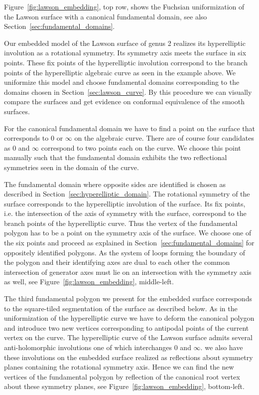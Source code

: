 \documentclass[Thesis.tex]{subfiles}
\begin{document}
Figure~\ref{fig:lawson_embedding}, top row, shows the Fuchsian uniformization of the Lawson surface with a canonical fundamental domain, see also Section~\ref{sec:fundamental_domains}.

Our embedded model of the Lawson surface of genus 2 realizes its hyperelliptic involution as a rotational symmetry.
Its symmetry axis meets the surface in six points. These fix points of the hyperelliptic involution correspond to the branch points of the hyperelliptic algebraic curve as seen in the example above. We uniformize this model and choose fundamental domains corresponding to the domains chosen in Section~\ref{sec:lawson_curve}. By this procedure we can visually compare the surfaces and get evidence on conformal equivalence of the smooth surfaces.

For the canonical fundamental domain we have to find a point on the surface that corresponds to $0$ or $\infty$ on the algebraic curve. There are of course four candidates as $0$ and $\infty$ correspond to two points each on the curve. We choose this point manually such that the fundamental domain exhibits the two reflectional symmetries seen in the domain of the curve.

The fundamental domain where opposite sides are identified is chosen as described in Section~\ref{sec:hyperelliptic_domain}. The rotational symmetry of the surface corresponds to the hyperelliptic involution of the surface. Its fix points, i.e. the intersection of the axis of symmetry with the surface, correspond to the branch points of the hyperelliptic curve. Thus the vertex of the fundamental polygon has to be a point on the symmetry axis of the surface. We choose one of the six points and proceed as explained in Section~\ref{sec:fundamental_domains} for oppositely identified polygons. As the system of loops forming the boundary of the polygon and their identifying axes are dual to each other the common intersection of generator axes must lie on an intersection with the symmetry axis as well, see Figure~\ref{fig:lawson_embedding}, middle-left.

The third fundamental polygon we present for the embedded surface corresponds to the square-tiled segmentation of the surface as described below. As in the uniformization of the hyperelliptic curve we have to deform the canonical polygon and introduce two new vertices corresponding to antipodal points of the current vertex on the curve. The hyperelliptic curve of the Lawson surface admits several anti-holomorphic involutions one of which interchanges $0$ and $\infty$. we also have these involutions on the embedded surface realized as reflections about symmetry planes containing the rotational symmetry axis. Hence we can find the new vertices of the fundamental polygon by reflection of the canonical root vertex about these symmetry planes, see Figure~\ref{fig:lawson_embedding}, bottom-left.
\end{document}
